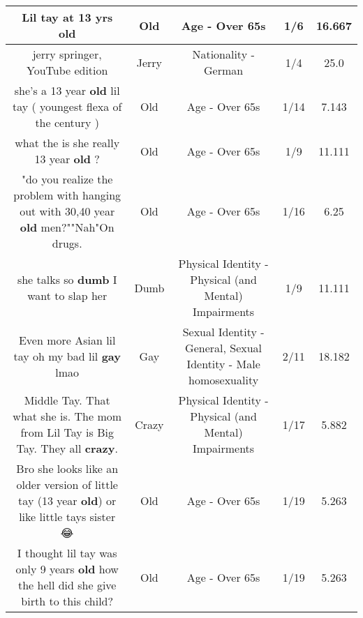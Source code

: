 \documentclass[11pt]{article}
\newlength\mylength
\begin{document}
\begin{center}
\begin{longtable}{|C{.65\mylength}|C{.30\mylength}|C{.12\mylength}|C{.12\mylength}|C{.12\mylength}|}
  \small Lil tay at 13 yrs old\normalsize   & Old & Age - Over 65s & 1/6 & 16.667 \\  \hline
  \small jerry springer, YouTube edition\normalsize   & Jerry & Nationality - German & 1/4 & 25.0 \\  \hline
  \small she's a 13 year \textbf{old} lil tay ( youngest flexa of the century )\normalsize   & Old & Age - Over 65s & 1/14 & 7.143 \\  \hline
  \small what the is she really 13 year \textbf{old} ?\normalsize   & Old & Age - Over 65s & 1/9 & 11.111 \\  \hline
  \small "do you realize the problem with hanging out with 30,40 year \textbf{old} men?""Nah"On drugs.\normalsize   & Old & Age - Over 65s & 1/16 & 6.25 \\  \hline
  \small she talks so \textbf{dumb} I want to slap her\normalsize   & Dumb & Physical Identity - Physical (and Mental) Impairments & 1/9 & 11.111 \\  \hline
  \small Even more Asian lil tay oh my bad lil \textbf{g\textbf{ay}} lmao\normalsize   & Gay & Sexual Identity - General, Sexual Identity - Male homosexuality & 2/11 & 18.182 \\  \hline
  \small Middle Tay. That what she is. The mom from Lil Tay is Big Tay. They all \textbf{crazy}.\normalsize   & Crazy & Physical Identity - Physical (and Mental) Impairments & 1/17 & 5.882 \\  \hline
  \small Bro she looks like an older version of little tay (13 year \textbf{old}) or like little tays sister 😂\normalsize   & Old & Age - Over 65s & 1/19 & 5.263 \\  \hline
  \small I thought lil tay was only 9 years \textbf{old} how the hell did she give birth to this child?\normalsize   & Old & Age - Over 65s & 1/19 & 5.263 \\  \hline

\end{longtable}
\end{center}
\end{document}
